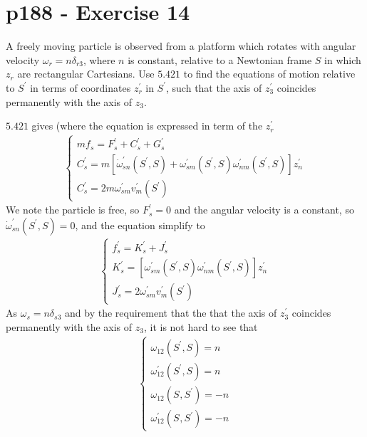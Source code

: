 \section{p188 - Exercise 14}
\begin{tcolorbox}
A freely moving particle is observed from a platform which rotates with angular velocity $\omega_r = n\delta_{r3}$, where $n$ is constant, relative to a Newtonian frame $S$ in which $z_r$ are rectangular Cartesians. Use $\mathbf{5.421}$ to find the equations of motion relative to $S^{'}$ in terms of coordinates  $z^{'}_r$ in $S^{'}$, such that the axis of $z^{'}_3$ coincides permanently with the axis of $z_3$.
\end{tcolorbox} 
$\mathbf{5.421}$ gives (where the equation is expressed in term of the $z^{'}_r$
\begin{align}
\left\{\begin{array}{l}
mf_s = F^{'}_s + C^{'}_s + G^{'}_s\\
C^{'}_s= m\left[\dot{\omega}^{'}_{sn}\left(S^{'},S\right) + \omega^{'}_{sm}\left(S^{'},S\right)\omega^{'}_{nm}\left(S^{'},S\right)\right]z^{'}_n\\
C^{'}_s = 2m\omega^{'}_{sm}v^{'}_m\left(S^{'}\right)
\end{array}\right.
\end{align}
We note the particle is free, so $F^{'}_s=0$ and the angular velocity is a constant, so $\dot{\omega}^{'}_{sn}\left(S^{'},S\right)=0$, and the equation simplify to 
\begin{align}
\left\{\begin{array}{l}
f^{'}_s = K^{'}_s + J^{'}_s\\
K^{'}_s= \left[ \omega^{'}_{sm}\left(S^{'},S\right)\omega^{'}_{nm}\left(S^{'},S\right)\right]z^{'}_n\\
J^{'}_s = 2\omega^{'}_{sm}v^{'}_m\left(S^{'}\right)
\end{array}\right.
\end{align}
As $\omega_s= n\delta_{s3}$ and by the requirement that the that the axis of $z^{'}_3$ coincides permanently with the axis of $z_3$, it is not hard to see that
\begin{align}
\left\{\begin{array}{llll}
\omega^{}_{12}\left(S^{'},S\right) = n\\
\omega^{'}_{12}\left(S^{'},S\right) = n\\
\omega^{}_{12}\left(S^{},S^{'}\right) = -n\\
\omega^{'}_{12}\left(S^{},S^{'}\right) = -n
\end{array}\right.
\end{align}
